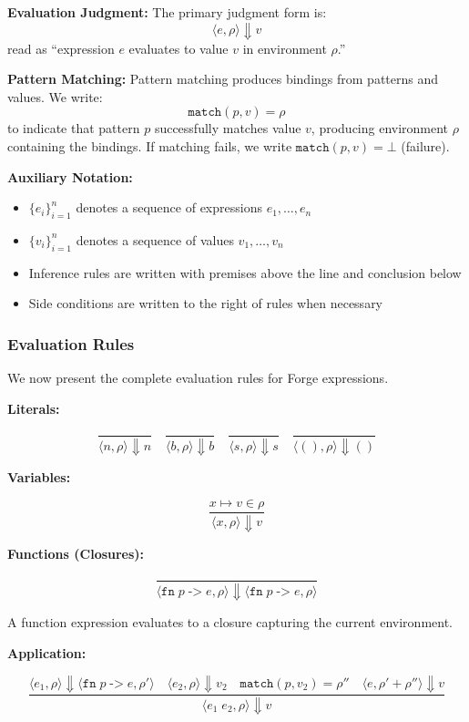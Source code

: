 \documentclass[conference,onecolumn]{IEEEtran}
\begin{document}
\textbf{Evaluation Judgment:}
The primary judgment form is:
$$\langle e, \rho \rangle \Downarrow v$$
read as ``expression $e$ evaluates to value $v$ in environment $\rho$.''

\textbf{Pattern Matching:}
Pattern matching produces bindings from patterns and values. We write:
$$\texttt{match}(p, v) = \rho$$
to indicate that pattern $p$ successfully matches value $v$, producing environment $\rho$ containing the bindings. If matching fails, we write $\texttt{match}(p, v) = \bot$ (failure).

\textbf{Auxiliary Notation:}
\begin{itemize}
\item $\{e_i\}_{i=1}^{n}$ denotes a sequence of expressions $e_1, \ldots, e_n$
\item $\{v_i\}_{i=1}^{n}$ denotes a sequence of values $v_1, \ldots, v_n$
\item Inference rules are written with premises above the line and conclusion below
\item Side conditions are written to the right of rules when necessary
\end{itemize}

\subsubsection{Evaluation Rules}

We now present the complete evaluation rules for Forge expressions.

\textbf{Literals:}

$$\frac{}{\langle n, \rho \rangle \Downarrow n}
\quad
\frac{}{\langle b, \rho \rangle \Downarrow b}
\quad
\frac{}{\langle s, \rho \rangle \Downarrow s}
\quad
\frac{}{\langle (), \rho \rangle \Downarrow ()}$$

\textbf{Variables:}

$$\frac{x \mapsto v \in \rho}{\langle x, \rho \rangle \Downarrow v}$$

\textbf{Functions (Closures):}

$$\frac{}{\langle \texttt{fn} \; p \; \texttt{->} \; e, \rho \rangle \Downarrow \langle \texttt{fn} \; p \; \texttt{->} \; e, \rho \rangle}$$

A function expression evaluates to a closure capturing the current environment.

\textbf{Application:}

$$\frac{\langle e_1, \rho \rangle \Downarrow \langle \texttt{fn} \; p \; \texttt{->} \; e, \rho' \rangle \quad \langle e_2, \rho \rangle \Downarrow v_2 \quad \texttt{match}(p, v_2) = \rho'' \quad \langle e, \rho' + \rho'' \rangle \Downarrow v}{\langle e_1 \; e_2, \rho \rangle \Downarrow v}$$
\end{document}
